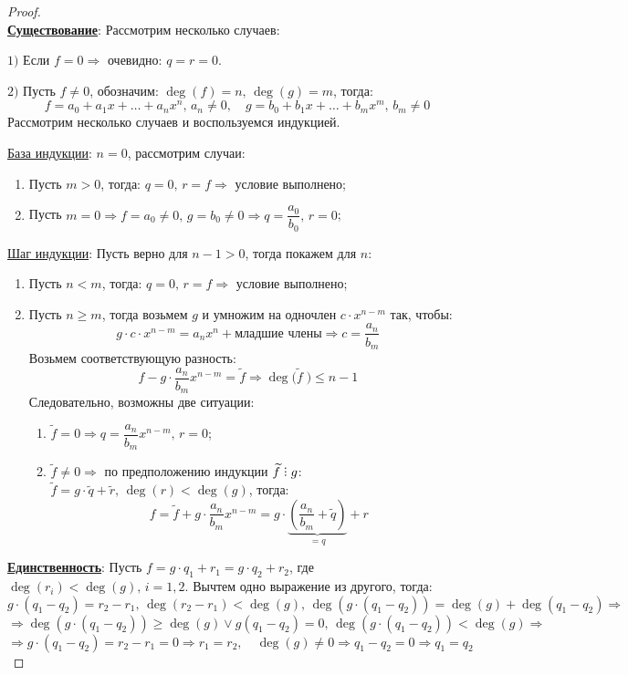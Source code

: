 \documentclass[12pt]{article}
\theoremstyle{definition}
\DeclareRobustCommand{\divby}{%
	\mathrel{\text{\vbox{\baselineskip.65ex\lineskiplimit0pt\hbox{.}\hbox{.}\hbox{.}}}}%
}
\newcommand{\wte}[1]{\widetilde{#1}}
\begin{document}
\begin{proof}\hfill\\
	\textbf{\uline{Существование}}: Рассмотрим несколько случаев:
	
	$1)$ Если $f = 0 \Rightarrow$ очевидно: $q = r = 0$. 
	
	$2)$ Пусть $f \neq 0$, обозначим: $\deg(f) = n, \, \deg(g) = m$, тогда:
	$$
		f = a_0 + a_1x + \dotsc + a_nx^n, \, a_n \neq 0,  \quad g = b_0 + b_1x+ \dotsc + b_m x^m , \, b_m \neq 0
	$$
	\newpage
	Рассмотрим несколько случаев и воспользуемся индукцией.
	
	\uline{База индукции}: $n = 0$, рассмотрим случаи:
	\begin{enumerate}[label=(\arabic*)]
		\item Пусть $m > 0$, тогда: $q = 0, \, r = f \Rightarrow$ условие выполнено;
		\item Пусть $m = 0 \Rightarrow f = a_0 \neq 0, \, g = b_0 \neq 0 \Rightarrow q = \dfrac{a_0}{b_0}, \, r = 0$;
	\end{enumerate}
	\uline{Шаг индукции}: Пусть верно для $n-1 > 0$, тогда покажем для $n$:
	\begin{enumerate}[label=(\arabic*)]
		\item Пусть $n < m$, тогда: $q = 0, \, r = f \Rightarrow$ условие выполнено;
		\item Пусть $n \geq m$, тогда возьмем $g$ и умножим на одночлен $c{\cdot}x^{n-m}$ так, чтобы:
		$$
			g{\cdot}c{\cdot}x^{n - m} = a_n x^n + \text{младшие члены}	\Rightarrow c = \dfrac{a_n}{b_m}
		$$
		Возьмем соответствующую разность: 
		$$
			f - g{\cdot}\dfrac{a_n}{b_m}x^{n -m} = \wte{f} \Rightarrow \deg\big({\wte{f}\;}\big) \leq n - 1
		$$
		Следовательно, возможны две ситуации:
		\begin{enumerate}[label=\alph*)]
			\item $\wte{f} = 0 \Rightarrow q = \dfrac{a_n}{b_m}x^{n- m}, \, r = 0$;
			\item $\wte{f} \neq 0 \Rightarrow$ по предположению индукции $\wte{f} \divby g$: $\wte{f} = g{\cdot}\wte{q} + \wte{r}, \, \deg(r) < \deg(g)$, тогда:
			$$
				f = \wte{f} + g{\cdot}\dfrac{a_n}{b_m}x^{n-m} = g{\cdot}\underbrace{\left(\dfrac{a_n}{b_m} + \wte{q}\right)}_{=q} + r
			$$
		\end{enumerate}
	\end{enumerate}

	\textbf{\uline{Единственность}}: Пусть $f = g{\cdot}q_1 + r_1 = g{\cdot}q_2 + r_2$, где $\deg(r_i) < \deg(g), \, i =1,2$. Вычтем одно выражение из другого, тогда:
	$$
		g{\cdot}(q_1 - q_2) = r_2 - r_1, \, \deg(r_2 - r_1) < \deg(g), \, \deg(g{\cdot}(q_1 - q_2)) = \deg(g) + \deg(q_1 - q_2) \Rightarrow
	$$
	$$
		\Rightarrow \deg(g{\cdot}(q_1 - q_2)) \geq \deg(g) \vee g(q_1 - q_2) = 0, \, \deg(g{\cdot}(q_1 - q_2)) < \deg(g) \Rightarrow 
	$$
	$$
		\Rightarrow g{\cdot}(q_1 - q_2) = r_2 - r_1 = 0 \Rightarrow r_1 = r_2, \quad \deg(g) \neq 0 \Rightarrow q_1 - q_2 = 0 \Rightarrow q_1 = q_2
	$$
\end{proof}
\end{document}
